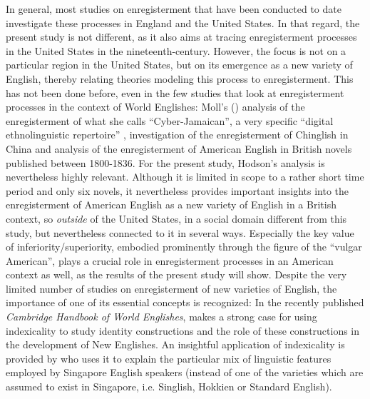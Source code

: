In general, most studies on enregisterment that have been conducted to date investigate these processes in England and the United States. In that regard, the present study is not different, as it also aims at tracing enregisterment processes in the United States in the nineteenth-century. However, the focus is not on a particular region in the United States, but on its emergence as a new variety of English, thereby relating theories modeling this process to enregisterment. This has not been done before, even in the few studies that look at enregisterment processes in the context of World Englishes: Moll’s (\citeyear{Moll2017, Moll2014}) analysis of the enregisterment of what she calls “Cyber-Jamaican”, a very specific “digital ethnolinguistic repertoire” \citep[216]{Moll2014},  investigation of the enregisterment of Chinglish in China and  analysis of the enregisterment of American English in British novels published between 1800-1836. For the present study, Hodson’s analysis is nevertheless highly relevant. Although it is limited in scope to a rather short time period and only six novels, it nevertheless provides important insights into the enregisterment of American English as a new variety of English in a British context, so \emph{outside} of the United States, in a social domain different from this study, but nevertheless connected to it in several ways. Especially the key value of inferiority/superiority, embodied prominently through the figure of the “vulgar American”, plays a crucial role in enregisterment processes in an American context as well, as the results of the present study will show. Despite the very limited number of studies on enregisterment of new varieties of English, the importance of one of its essential concepts is recognized: In the recently published \emph{Cambridge Handbook of World Englishes}, \citet{Schleef2020} makes a strong case for using indexicality to study identity constructions and the role of these constructions in the development of New Englishes. An insightful application of indexicality is provided by \citet{Leimgruber2012, Leimgruber2013} who uses it to explain the particular mix of linguistic features employed by Singapore English speakers (instead of one of the varieties which are assumed to exist in Singapore, i.e. Singlish, Hokkien or Standard English).

